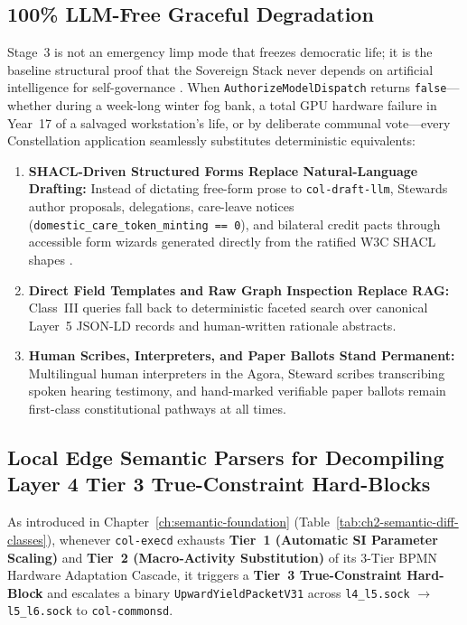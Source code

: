 \subsection{100\% LLM-Free Graceful Degradation}
\label{subsec:zero-llm-graceful-degradation}

Stage~3 is not an emergency limp mode that freezes democratic life; it is the baseline structural proof that the Sovereign Stack never depends on artificial intelligence for self-governance \parencite{illich1973,ostrom1990}. When \texttt{AuthorizeModelDispatch} returns \texttt{false}---whether during a week-long winter fog bank, a total GPU hardware failure in Year~17 of a salvaged workstation's life, or by deliberate communal vote---every Constellation application seamlessly substitutes deterministic equivalents:
\begin{enumerate}
  \item \textbf{SHACL-Driven Structured Forms Replace Natural-Language Drafting:} Instead of dictating free-form prose to \texttt{col-draft-llm}, Stewards author proposals, delegations, care-leave notices (\texttt{domestic\_care\_token\_minting == 0}), and bilateral credit pacts through accessible form wizards generated directly from the ratified W3C SHACL shapes \parencite{w3c2017shacl}.
  \item \textbf{Direct Field Templates and Raw Graph Inspection Replace RAG:} Class~III queries fall back to deterministic faceted search over canonical Layer~5 JSON-LD records and human-written rationale abstracts.
  \item \textbf{Human Scribes, Interpreters, and Paper Ballots Stand Permanent:} Multilingual human interpreters in the Agora, Steward scribes transcribing spoken hearing testimony, and hand-marked verifiable paper ballots remain first-class constitutional pathways at all times.
\end{enumerate}

\subsection{Local Edge Semantic Parsers for Decompiling Layer 4 Tier 3 True-Constraint Hard-Blocks}
\label{subsec:tier3-semantic-diff-parsing}

As introduced in Chapter~\ref{ch:semantic-foundation} (Table~\ref{tab:ch2-semantic-diff-classes}), whenever \texttt{col-execd} exhausts \textbf{Tier~1 (Automatic SI Parameter Scaling)} and \textbf{Tier~2 (Macro-Activity Substitution)} of its 3-Tier BPMN Hardware Adaptation Cascade, it triggers a \textbf{Tier~3 True-Constraint Hard-Block} and escalates a binary \texttt{UpwardYieldPacketV31} across \texttt{l4\_l5.sock} $\to$ \texttt{l5\_l6.sock} to \texttt{col-commonsd}.


